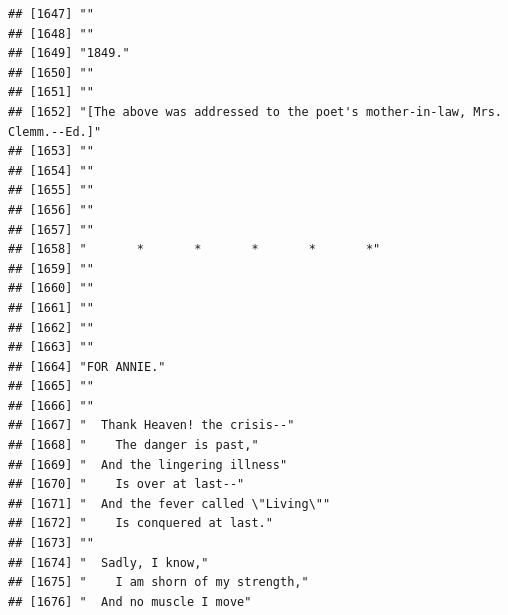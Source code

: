 \documentclass{article}\usepackage[]{graphicx}\usepackage[]{color}
\makeatletter
\newenvironment{kframe}{%
 \def\at@end@of@kframe{}%
 \ifinner\ifhmode%
  \def\at@end@of@kframe{\end{minipage}}%
  \begin{minipage}{\columnwidth}%
 \fi\fi%
 \def\FrameCommand##1{\hskip\@totalleftmargin \hskip-\fboxsep
 \colorbox{shadecolor}{##1}\hskip-\fboxsep
     \hskip-\linewidth \hskip-\@totalleftmargin \hskip\columnwidth}%
 \MakeFramed {\advance\hsize-\width
   \@totalleftmargin\z@ \linewidth\hsize
   \@setminipage}}%
 {\par\unskip\endMakeFramed%
 \at@end@of@kframe}
\newenvironment{knitrout}{}{} %
\makeatother
\begin{document}
\begin{knitrout}
\begin{kframe}
\begin{verbatim}
## [1647] ""                                                                            
## [1648] ""                                                                            
## [1649] "1849."                                                                       
## [1650] ""                                                                            
## [1651] ""                                                                            
## [1652] "[The above was addressed to the poet's mother-in-law, Mrs. Clemm.--Ed.]"     
## [1653] ""                                                                            
## [1654] ""                                                                            
## [1655] ""                                                                            
## [1656] ""                                                                            
## [1657] ""                                                                            
## [1658] "       *       *       *       *       *"                                    
## [1659] ""                                                                            
## [1660] ""                                                                            
## [1661] ""                                                                            
## [1662] ""                                                                            
## [1663] ""                                                                            
## [1664] "FOR ANNIE."                                                                  
## [1665] ""                                                                            
## [1666] ""                                                                            
## [1667] "  Thank Heaven! the crisis--"                                                
## [1668] "    The danger is past,"                                                     
## [1669] "  And the lingering illness"                                                 
## [1670] "    Is over at last--"                                                       
## [1671] "  And the fever called \"Living\""                                           
## [1672] "    Is conquered at last."                                                   
## [1673] ""                                                                            
## [1674] "  Sadly, I know,"                                                            
## [1675] "    I am shorn of my strength,"                                              
## [1676] "  And no muscle I move"                                                      

\end{verbatim}
\end{kframe}
\end{knitrout}
\end{document}
